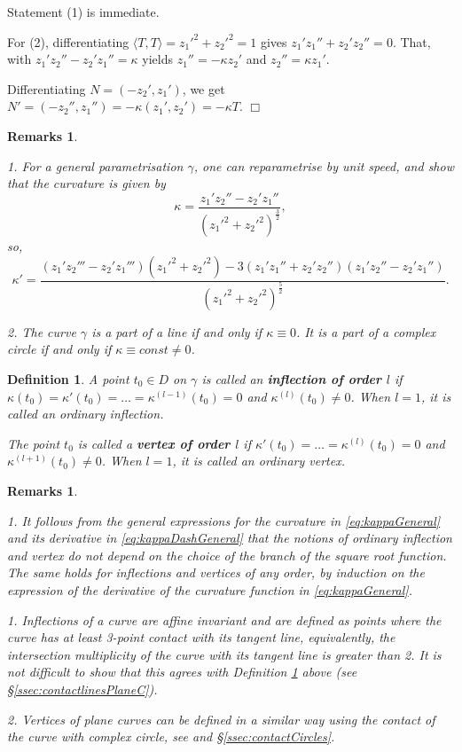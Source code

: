 \documentclass[12pt,a4paper]{article}
\newtheorem{defn}[prop]{Definition}
\newtheorem{rems}[prop]{Remarks}
\newenvironment{proof}
{\begin{trivlist} \item[\hskip \labelsep {\bf Proof}\hspace*{3 mm}]}
	{\hfill$\Box$\end{trivlist}}
\begin{document}
\begin{proof}
Statement (1) is immediate.

For (2), differentiating $\langle T, {T} \rangle=z_1'^2+z_2'^2=1$ gives $z_1'z_1''+z_2'z_2''=0$.
That, with $z_1'z_2''-z_2'z_1''=\kappa$ yields $z_1''=-\kappa z_2'$ and $z_2''=\kappa z_1'$.

Differentiating $N=(-z_2',z_1')$, we get 
$N'=(-z_2'',z_1'')=-\kappa (z_1',z_2')=-\kappa T.$
\end{proof} 


\begin{rems}\label{rem:kappaRegularC}
{\rm 
1. For a general parametrisation $\gamma$, one can reparametrise by unit speed, and show that the curvature is given by 
\begin{equation}\label{eq:kappaGeneral}
\kappa=\frac{z_1'z_2''-z_2'z_1''}{(z_1'^2+z_2'^2)^{\frac32}},  
\end{equation}
so,
\begin{equation}\label{eq:kappaDashGeneral}
\kappa'=\frac{(z_1'z_2'''-z_2'z_1''')(z_1'^2+z_2'^2)-3(z_1'z_1''+z_2'z_2'')(z_1'z_2''-z_2'z_1'')}{(z_1'^2+z_2'^2)^{\frac52}}.   
\end{equation}


2. The curve $\gamma$ is a part of a line if and only if $\kappa\equiv 0$.
It is a part of a complex circle if and only if $\kappa\equiv const\ne 0$.
}
\end{rems}

\begin{defn}\label{def:InfVert}
A point $t_0\in D$ on $\gamma$ is called an {\bf inflection of order $l$} if $\kappa(t_0)=\kappa'(t_0)=\ldots=\kappa^{(l-1)}(t_0)=0$ and $\kappa^{(l)}(t_0)\ne 0$. When $l=1$, it is called an 
ordinary inflection.

The point $t_0$ is called a {\bf vertex of order $l$} if $\kappa'(t_0)=\ldots=\kappa^{(l)}(t_0)=0$ and $\kappa^{(l+1)}(t_0)\ne 0$.  When $l=1$, it is called an 
ordinary vertex.
\end{defn}

\begin{rems}\label{rems:Propertieskappa}
{\rm 
1. It follows from the general expressions for the curvature in \eqref{eq:kappaGeneral} and its derivative in \eqref{eq:kappaDashGeneral} that the notions of ordinary inflection and vertex do not depend on the choice of the branch of the square root function. The same holds for inflections and vertices of any order, by induction on the expression of the derivative of the curvature function in \eqref{eq:kappaGeneral}.

1. Inflections of a curve are affine invariant and are defined as points where the curve has at least 3-point contact with its tangent line, equivalently, the intersection multiplicity of the curve with its tangent line is greater than 2. It is not difficult to show that this agrees with Definition \ref{def:InfVert} above (see \S \ref{ssec:contactlinesPlaneC}).

2. Vertices of plane curves can be defined in a similar way using the contact of the curve with complex circle, see \cite{BillMarcoF,Piene_etal,viro} and \S \ref{ssec:contactCircles}.
}
\end{rems}
\end{document}
